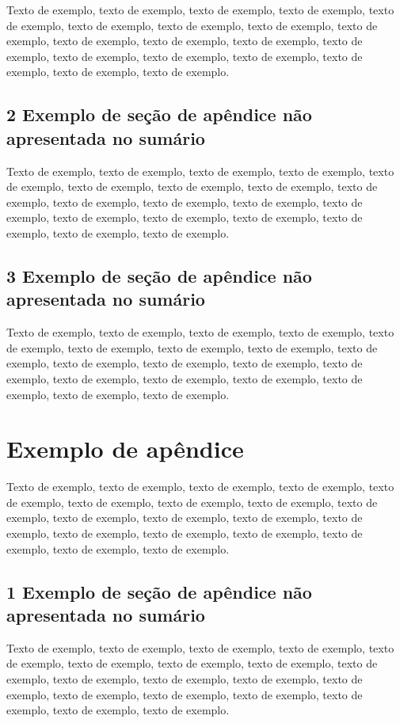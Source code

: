 \documentclass[
	12pt,				%
	oneside,			%
	a4paper,			%
	english,			%
	brazil				%
	]{abntex2ppgsi}
\begin{document}
\begin{apendicesenv}
Texto de exemplo, texto de exemplo, texto de exemplo, texto de exemplo, texto de exemplo, texto de exemplo, texto de exemplo, texto de exemplo, texto de exemplo, texto de exemplo, texto de exemplo, texto de exemplo, texto de exemplo, texto de exemplo, texto de exemplo, texto de exemplo, texto de exemplo, texto de exemplo, texto de exemplo.

\section*{2 Exemplo de seção de apêndice não apresentada no sumário}

Texto de exemplo, texto de exemplo, texto de exemplo, texto de exemplo, texto de exemplo, texto de exemplo, texto de exemplo, texto de exemplo, texto de exemplo, texto de exemplo, texto de exemplo, texto de exemplo, texto de exemplo, texto de exemplo, texto de exemplo, texto de exemplo, texto de exemplo, texto de exemplo, texto de exemplo.

\section*{3 Exemplo de seção de apêndice não apresentada no sumário}

Texto de exemplo, texto de exemplo, texto de exemplo, texto de exemplo, texto de exemplo, texto de exemplo, texto de exemplo, texto de exemplo, texto de exemplo, texto de exemplo, texto de exemplo, texto de exemplo, texto de exemplo, texto de exemplo, texto de exemplo, texto de exemplo, texto de exemplo, texto de exemplo, texto de exemplo.


\chapter{Exemplo de apêndice}

Texto de exemplo, texto de exemplo, texto de exemplo, texto de exemplo, texto de exemplo, texto de exemplo, texto de exemplo, texto de exemplo, texto de exemplo, texto de exemplo, texto de exemplo, texto de exemplo, texto de exemplo, texto de exemplo, texto de exemplo, texto de exemplo, texto de exemplo, texto de exemplo, texto de exemplo.

\section*{1 Exemplo de seção de apêndice não apresentada no sumário}

Texto de exemplo, texto de exemplo, texto de exemplo, texto de exemplo, texto de exemplo, texto de exemplo, texto de exemplo, texto de exemplo, texto de exemplo, texto de exemplo, texto de exemplo, texto de exemplo, texto de exemplo, texto de exemplo, texto de exemplo, texto de exemplo, texto de exemplo, texto de exemplo, texto de exemplo.


\end{apendicesenv}
\end{document}
